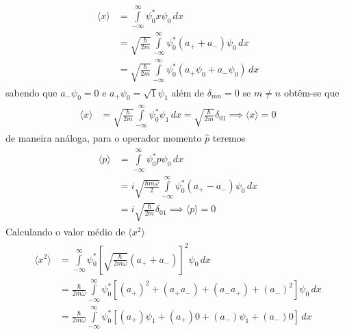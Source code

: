 \begin{prob}
\begin{sol}
\begin{enumerate}[label=\alph *)]
				\begin{align}
						\begin{split}
							\langle x \rangle &= \int\limits_{-\infty}^{\infty} \psi^{*}_{0}x \psi_{0}\,d{x}\\
																&= \sqrt{\frac{\hbar}{2m}}\int\limits_{-\infty}^{\infty} \psi_{0}^{*}\left(a_{+}+a_{-}\right) \psi_{0}\,d{x}\\
																&= \sqrt{\frac{\hbar}{2m}}\int\limits_{-\infty}^{\infty} \psi_{0}^{*}\left(a_{+} \psi_{0}+a_{-} \psi_{0}\right)\,d{x}
						\end{split}
				\end{align}
				sabendo que $a_{-} \psi_{0}=0$ e $a_{+} \psi_{0}=\sqrt{1} \psi_{1}$ além de $\delta_{mn}=0$ se $m\neq n$ obtêm-se que
				\begin{align}
						\begin{split}
							\langle x \rangle &= \sqrt{\frac{\hbar}{2m}}\int\limits_{-\infty}^{\infty} \psi_{0}^{*} \psi_{1}\,d{x}=\sqrt{\frac{\hbar}{2m}}\delta_{01}\implies\boxed{\langle x \rangle = 0}
						\end{split}
				\end{align}
				de maneira análoga, para o operador momento $\hat{p}$ teremos
				\begin{align}
						\begin{split}
							\langle p \rangle &= \int\limits_{-\infty}^{\infty} \psi_{0}^{*}p \psi_{0}\,d{x}\\
																&= i\sqrt{\frac{\hbar m \omega}{2}}\int\limits_{-\infty}^{\infty} \psi_{0}^{*}\left(a_{+}-a_{-}\right) \psi_{0}\,d{x}\\
																&= i\sqrt{\frac{\hbar}{2m}} \delta_{01}\implies \boxed{\langle p \rangle=0}
						\end{split}
				\end{align}
				Calculando o valor médio de $\langle x^{2} \rangle$
				\begin{align}
						\begin{split}
						\langle x^{2} \rangle &= \int\limits_{-\infty}^{\infty} \psi_{0}^{*}\left[\sqrt{\frac{\hbar}{2m \omega}}\left(a_{+}+a_{-}\right)\right]^{2} \psi_{0}\,d{x}\\
																	&= \frac{\hbar}{2m \omega}\int\limits_{-\infty}^{\infty} \psi_{0}^{*}\left[(a_{+})^{2}+(a_{+}a_{-})+(a_{-}a_{+})+(a_{-})^{2}\right] \psi_{0}\,d{x}\\
																	&= \frac{\hbar}{2m \omega}\int\limits_{-\infty}^{\infty} \psi_{0}^{*}\left[(a_{+}) \psi_{1}+(a_{+})0+(a_{-}) \psi_{1}+(a_{-})0\right]\,d{x}\\

\end{split}
\end{align}
\end{enumerate}
\end{sol}
\end{prob}
